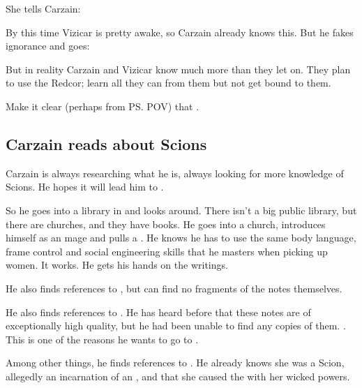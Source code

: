\begin{garbage}
She tells Carzain: 

By this time Vizicar is pretty awake, so Carzain already knows this. 
But he fakes ignorance and goes: 

But in reality Carzain and Vizicar know much more than they let on. 
They plan to use the Redcor; learn all they can from them but not get bound to them. 

Make it clear (perhaps from \ps{\Esmerel} POV) that . 









\subsection{Carzain reads about Scions}
Carzain is always researching what he is, always looking for more knowledge of Scions. 
He hopes it will lead him to \apotheosis. 

So he goes into a library in \Forklin{} and looks around. 
There isn't a big public library, but there are churches, and they have books. 
He goes into a church, introduces himself as an \ishrah{} mage and pulls a .
He knows he has to use the same body language, frame control and social engineering skills that he masters when picking up women.
It works.
He gets his hands on the writings.

He also finds references to , but can find no fragments of the notes themselves. 

He also finds references to . 
He has heard before that these notes are of exceptionally high quality, but he had been unable to find any copies of them. 
. 
This is one of the reasons he wants to go to \Redce. 

Among other things, he finds references to \Belzir. 
He already knows she was a Scion, allegedly an incarnation of an  \malach, and that she caused the \HundredScourges{} with her wicked \malach{} powers. 










\end{garbage}
